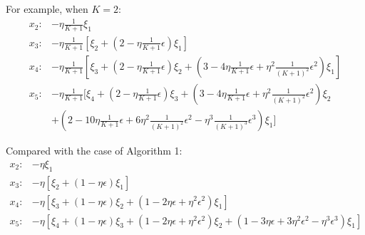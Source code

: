 \documentclass[11pt,letterpaper,english]{article}
\begin{document}
For example, when $K=2$:
\begin{align*}
x_2: &-\eta \frac{1}{K+1} \xi_1 \\
x_3: &-\eta \frac{1}{K+1} \left[ \xi_2 + \left( 2- \eta \frac{1}{K+1}\epsilon\right)\xi_1\right]\\
x_4: &-\eta \frac{1}{K+1} \left[ \xi_3 + \left( 2- \eta \frac{1}{K+1}\epsilon\right)\xi_2+ \left( 3- 4\eta \frac{1}{K+1}\epsilon+\eta^2 \frac{1}{(K+1)^2}\epsilon^2\right)\xi_1\right]\\
x_5: &-\eta \frac{1}{K+1} [ \xi_4 + \left( 2- \eta \frac{1}{K+1}\epsilon\right)\xi_3+\left( 3- 4\eta \frac{1}{K+1}\epsilon+\eta^2 \frac{1}{(K+1)^2}\epsilon^2\right)\xi_2  \\
&+ \left( 2- 10\eta \frac{1}{K+1}\epsilon+6\eta^2 \frac{1}{(K+1)^2}\epsilon^2-\eta^3 \frac{1}{(K+1)^3}\epsilon^3\right)\xi_1]
\end{align*}

Compared with the case of Algorithm 1:
\begin{align*}
x_2: &-\eta  \xi_1 \\
x_3: &-\eta  \left[ \xi_2 + \left( 1- \eta \epsilon\right)\xi_1\right]\\
x_4: &-\eta  \left[ \xi_3 + \left( 1- \eta \epsilon\right)\xi_2+ \left( 1- 2\eta \epsilon+\eta^2 \epsilon^2\right)\xi_1\right]\\
x_5: &-\eta  \left[ \xi_4 + \left( 1- \eta \epsilon\right)\xi_3+ \left( 1- 2\eta \epsilon+\eta^2 \epsilon^2\right)\xi_2+ \left( 1- 3\eta \epsilon+3\eta^2 \epsilon^2-\eta^3 \epsilon^3\right)\xi_1\right]
\end{align*}
\end{document}
